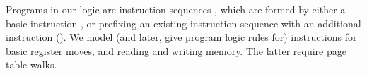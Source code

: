 
Programs in our logic are instruction sequences \instrs, which are formed by either a basic instruction \iskip, or prefixing an existing instruction
sequence with an additional instruction (\iseq\instr\instrs).
We model (and later, give program logic rules for) instructions for basic register moves, and reading and writing memory.
The latter require page table walks.


